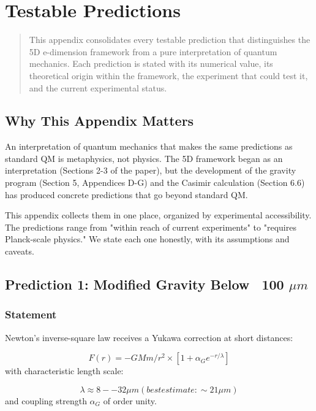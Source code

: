 \documentclass[aps,prd,preprint,superscriptaddress,longbibliography,floatfix]{revtex4-2}
\theoremstyle{remark}
\begin{document}
\section{Testable Predictions}


\begin{quote}
This appendix consolidates every testable prediction that distinguishes the
5D e-dimension framework from a pure interpretation of quantum mechanics.
Each prediction is stated with its numerical value, its theoretical origin
within the framework, the experiment that could test it, and the current
experimental status.
\end{quote}



\subsection{Why This Appendix Matters}

An interpretation of quantum mechanics that makes the same predictions as standard QM is metaphysics, not physics. The 5D framework began as an interpretation (Sections 2-3 of the paper), but the development of the gravity program (Section 5, Appendices D-G) and the Casimir calculation (Section 6.6) has produced concrete predictions that go beyond standard QM.

This appendix collects them in one place, organized by experimental accessibility. The predictions range from "within reach of current experiments" to "requires Planck-scale physics." We state each one honestly, with its assumptions and caveats.



\subsection{Prediction 1: Modified Gravity Below ~100 $\mu m$}


\subsubsection{Statement}

Newton's inverse-square law receives a Yukawa correction at short distances:


\begin{equation}
    F(r) = -GMm/r^{2} \times [1 + \alpha_G e^{-r/\lambda}]
\end{equation}
with characteristic length scale:


\begin{equation}
    \lambda \approx 8--32 \mu m    (best estimate: \sim 21 \mu m)
\end{equation}
and coupling strength $\alpha_G$ of order unity.
\end{document}
